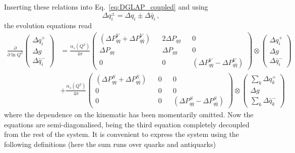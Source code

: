 Inserting these relations into Eq.~\eqref{eq:DGLAP_coupled} and using
\begin{equation}
  \Delta q_{i}^{\pm} = \Delta q_{i} \pm \Delta \bar{q}_{i} \,,
\end{equation}
the evolution equations read 
\begin{equation}
  \begin{split}
    \frac{\partial}{\partial \ln Q^2} 
    \left(\begin{matrix}
      \Delta q_i^{+} \\
      \Delta g \\
      \Delta \bar{q}_i^{-}
    \end{matrix} \right) & = \frac{\alpha_{s}(Q^2)}{4 \pi} 
    \left(\begin{matrix}
      (\Delta P_{qq}^{V} + \Delta P_{q\bar{q}}^{V}) && 2 \Delta P_{qg} && 0 \\
      \Delta P_{gq} && \Delta P_{gg} && 0 \\
      0 && 0 && (\Delta P_{qq}^{V} - \Delta P_{q\bar{q}}^{V})
    \end{matrix} \right) \otimes
    \left(\begin{matrix}
      \Delta q_i^{+} \\
      \Delta g \\
      \Delta \bar{q}_i^{-}
    \end{matrix} \right) 
    \\[10pt]
    & + \frac{\alpha_{s}(Q^2)}{4 \pi}
    \left(\begin{matrix}
      (\Delta P_{qq}^{S} + \Delta P_{q \bar{q}}^{S}) && 0 && 0 \\
      0 && 0 && 0 \\
      0 && 0 && (\Delta P_{qq}^{S} - \Delta P_{q\bar{q}}^{S})
    \end{matrix} \right) 
    \otimes
    \left(\begin{matrix}
      \sum_{k} \Delta q_k^{+} \\
      \Delta g \\
      \sum_{k} \Delta \bar{q}_k^{-}
    \end{matrix} \right)
  \end{split}
\end{equation}
where the dependence on the kinematic has been momentarily omitted. Now the equations are semi-diagonalised, being the third equation completely decoupled from the rest of the system. It is convenient to express the system using the following definitions (here the sum runs over quarks and antiquarks)
